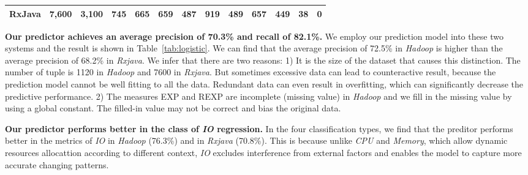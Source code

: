 \begin{table*}[tbh]
\begin{tabular}{|c|r|r|c|r|c|r|c|r|c|r|c|r|}
		RxJava            & 7,600                                                                           & 3,100                                                                  & \multicolumn{1}{r|}{745}                                & 665                                                                           & \multicolumn{1}{r|}{659}                                & 487                                                                           & \multicolumn{1}{r|}{919}                                & 489                                                                           & \multicolumn{1}{r|}{657}                                & 449                                                                           & \multicolumn{1}{r|}{38}                                 & 0                                                                             \\ \hline
	\end{tabular}
\end{table*}

 \textbf{Our predictor achieves an average precision of 70.3\% and recall of 82.1\%.} We employ our prediction model into these two systems and the result is shown in Table~\ref{tab:logistic}. We can find that the average precision of 72.5\% in \emph{Hadoop} is higher than the average precision of 68.2\% in \emph{Rxjava}. We infer that there are two reasons: 1) It is the size of the dataset that causes this distinction. The number of tuple is 1120 in \emph{Hadoop} and 7600 in \emph{Rxjava}. But sometimes excessive data can lead to counteractive result, because the prediction model cannot be well fitting to all the data. Redundant data can even result in overfitting, which can significantly decrease the predictive performance.  2) The measures EXP and REXP  are incomplete (missing value) in \emph{Hadoop} and we fill in the missing value by using a global constant. The filled-in value may not be correct and bias the original data.
 
 \textbf{Our predictor performs better in the class of \emph{IO} regression.} In the four classification types, we find that the preditor performs better in the metrics of \emph{IO} in \emph{Hadoop} (76.3\%) and in  \emph{Rxjava} (70.8\%). This is because unlike \emph{CPU} and \emph{Memory}, which allow dynamic resources allocattion according to different context, \emph{IO} excludes interference from external factors and enables the model to capture more accurate changing patterns.

